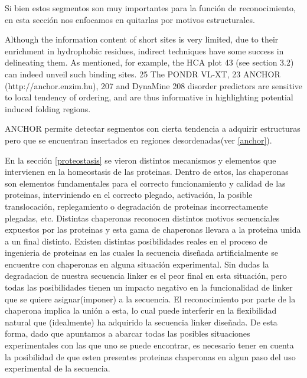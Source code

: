 Si bien estos segmentos son muy importantes para la función de reconocimiento, en esta sección nos enfocamos en quitarlas por motivos estructurales.


Although the information content of short sites is very limited, due to their enrichment in hydrophobic residues, indirect techniques have
some success in delineating them. As mentioned, for example, the HCA plot 43 (see section 3.2) can indeed unveil such binding
sites. 25 The PONDR VL-XT, 23 ANCHOR (http://anchor.enzim.hu), 207 and DynaMine 208 disorder predictors are sensitive
to local tendency of ordering, and are thus informative in highlighting potential induced folding regions.

ANCHOR permite detectar segmentos con cierta tendencia a adquirir estructuras pero que se encuentran insertados en regiones desordenadas(ver \ref{anchor}).







En la sección \ref{proteostasis} se vieron distintos mecanismos y elementos que intervienen en la homeostasis de las proteinas. 
Dentro de estos, las chaperonas son elementos fundamentales para el correcto funcionamiento y calidad de las proteinas, interviniendo en el correcto plegado, activación, la posible translocación, 
replegamiento o degradación de proteinas incorrectamente plegadas, etc.
Distintas chaperonas reconocen distintos motivos secuenciales expuestos por las proteinas y esta gama de chaperonas llevara a la proteina unida a un final distinto.
Existen distintas posibilidades reales en el proceso de ingenieria de proteinas en las cuales la secuencia diseñada artificialmente se encuentre con chaperonas en alguna situación experimental. 
Sin dudas la degradacion de nuestra secuencia linker es el peor final en esta situación, 
pero todas las posibilidades tienen un impacto negativo en la funcionalidad de linker que se quiere asignar(imponer) a la secuencia. 
El reconocimiento por parte de la chaperona implica la unión a esta, lo cual puede interferir en la flexibilidad natural que (idealmente) ha adquirido la secuencia linker diseñada. 
De esta forma, dado que apuntamos a abarcar todas las posibles situaciones experimentales con las que uno se puede encontrar, es necesario tener en cuenta 
la posibilidad de que esten presentes proteinas chaperonas en algun paso del uso experimental de la secuencia. 


